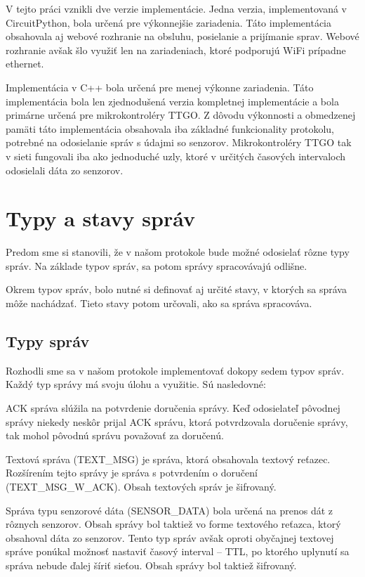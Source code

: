 \documentclass[slovak,master]{diploma}
\begin{document}
V tejto práci vznikli dve verzie implementácie. Jedna verzia, implementovaná v CircuitPython, bola určená pre výkonnejšie zariadenia. Táto implementácia obsahovala aj webové rozhranie na 
obsluhu, posielanie a prijímanie sprav. Webové rozhranie avšak šlo využiť len na zariadeniach, ktoré podporujú WiFi prípadne ethernet.

Implementácia v C++ bola určená pre menej výkonne zariadenia. Táto implementácia bola len zjednodušená verzia kompletnej implementácie a 
bola primárne určená pre mikrokontroléry TTGO. Z dôvodu výkonnosti a obmedzenej pamäti táto implementácia obsahovala iba základné funkcionality protokolu, potrebné na odosielanie správ s 
údajmi so senzorov. Mikrokontroléry TTGO tak v sieti fungovali iba ako jednoduché uzly, ktoré v určitých časových intervaloch odosielali dáta zo senzorov.

\section{Typy a stavy správ}
Predom sme si stanovili, že v našom protokole bude možné odosielať rôzne typy správ. Na základe typov správ, sa potom správy spracovávajú odlišne.

Okrem typov správ, bolo nutné si definovať aj určité stavy, v ktorých sa správa môže nachádzať. Tieto stavy potom určovali, ako sa správa spracováva.
\subsection{Typy správ}
Rozhodli sme sa v našom protokole implementovať dokopy sedem typov správ. Každý typ správy má svoju úlohu a využitie.
Sú nasledovné:

ACK správa slúžila na potvrdenie doručenia správy. Keď odosielateľ pôvodnej správy niekedy neskôr prijal ACK správu, ktorá 
potvrdzovala doručenie správy, tak mohol pôvodnú správu považovať za doručenú.

Textová správa (TEXT\_MSG) je správa, ktorá obsahovala textový reťazec. Rozšírením tejto správy je správa s potvrdením o doručení (TEXT\_MSG\_W\_ACK).
Obsah textových správ je šifrovaný.

Správa typu senzorové dáta (SENSOR\_DATA) bola určená na prenos dát z rôznych senzorov. Obsah správy bol taktiež vo forme textového 
reťazca, ktorý obsahoval dáta zo senzorov. Tento typ správ avšak oproti obyčajnej textovej správe ponúkal možnosť nastaviť 
časový interval -- TTL, po ktorého uplynutí sa správa nebude ďalej šíriť sieťou. Obsah správy bol taktiež šifrovaný.
\end{document}

